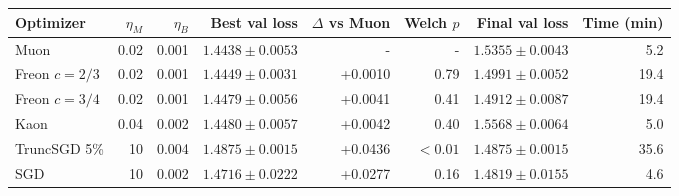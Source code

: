 \begin{tabular}{lrrrrrrr}
\toprule
Optimizer & $\eta_M$ & $\eta_B$ & Best val loss & $\Delta$ vs Muon & Welch $p$ & Final val loss & Time (min) \\
\midrule
Muon & 0.02 & 0.001 & $\mathbf{1.4438 \pm 0.0053}$ & - & - & $1.5355 \pm 0.0043$ & 5.2 \\
Freon $c=2/3$ & 0.02 & 0.001 & $1.4449 \pm 0.0031$ & +0.0010 & 0.79 & $1.4991 \pm 0.0052$ & 19.4 \\
Freon $c=3/4$ & 0.02 & 0.001 & $1.4479 \pm 0.0056$ & +0.0041 & 0.41 & $1.4912 \pm 0.0087$ & 19.4 \\
Kaon & 0.04 & 0.002 & $1.4480 \pm 0.0057$ & +0.0042 & 0.40 & $1.5568 \pm 0.0064$ & 5.0 \\
\midrule
TruncSGD 5\% & 10 & 0.004 & $1.4875 \pm 0.0015$ & +0.0436 & $<0.01$ & $1.4875 \pm 0.0015$ & 35.6 \\
SGD & 10 & 0.002 & $1.4716 \pm 0.0222$ & +0.0277 & 0.16 & $1.4819 \pm 0.0155$ & 4.6 \\
\bottomrule
\end{tabular}
